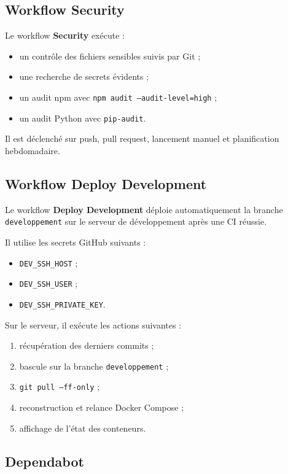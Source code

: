 \documentclass[11pt,a4paper]{article}
\begin{document}
\subsection{Workflow Security}

Le workflow \textbf{Security} exécute :

\begin{itemize}
  \item un contrôle des fichiers sensibles suivis par Git ;
  \item une recherche de secrets évidents ;
  \item un audit npm avec \texttt{npm audit --audit-level=high} ;
  \item un audit Python avec \texttt{pip-audit}.
\end{itemize}

Il est déclenché sur push, pull request, lancement manuel et planification
hebdomadaire.

\subsection{Workflow Deploy Development}

Le workflow \textbf{Deploy Development} déploie automatiquement la branche
\texttt{developpement} sur le serveur de développement après une CI réussie.

Il utilise les secrets GitHub suivants :

\begin{itemize}
  \item \texttt{DEV\_SSH\_HOST} ;
  \item \texttt{DEV\_SSH\_USER} ;
  \item \texttt{DEV\_SSH\_PRIVATE\_KEY}.
\end{itemize}

Sur le serveur, il exécute les actions suivantes :

\begin{enumerate}
  \item récupération des derniers commits ;
  \item bascule sur la branche \texttt{developpement} ;
  \item \texttt{git pull --ff-only} ;
  \item reconstruction et relance Docker Compose ;
  \item affichage de l'état des conteneurs.
\end{enumerate}

\subsection{Dependabot}
\end{document}
